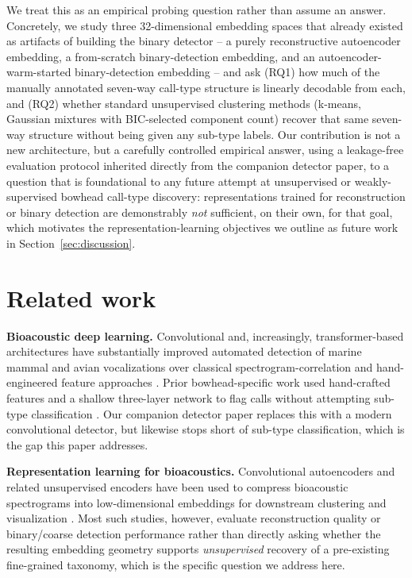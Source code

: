 \documentclass{article}
\begin{document}
We treat this as an empirical probing question rather than assume an
answer. Concretely, we study three 32-dimensional embedding spaces that
already existed as artifacts of building the binary detector -- a purely
reconstructive autoencoder embedding, a from-scratch binary-detection
embedding, and an autoencoder-warm-started binary-detection embedding --
and ask (RQ1) how much of the manually annotated seven-way call-type
structure is linearly decodable from each, and (RQ2) whether standard
unsupervised clustering methods (k-means, Gaussian mixtures with
BIC-selected component count) recover that same seven-way structure
without being given any sub-type labels. Our contribution is not a new
architecture, but a carefully controlled empirical answer, using a
leakage-free evaluation protocol inherited directly from the companion
detector paper, to a question that is foundational to any future attempt
at unsupervised or weakly-supervised bowhead call-type discovery: representations trained for
reconstruction or binary detection are demonstrably \emph{not}
sufficient, on their own, for that goal, which motivates the
representation-learning objectives we outline as future work in
Section~\ref{sec:discussion}.

\section{Related work}
\label{sec:related}

\textbf{Bioacoustic deep learning.} Convolutional and, increasingly,
transformer-based architectures have substantially improved automated
detection of marine mammal and avian vocalizations over classical
spectrogram-correlation and hand-engineered feature approaches
\citep{shiu2020deep, allen2021convolutional}. Prior bowhead-specific work
used hand-crafted features and a shallow three-layer network to flag calls
without attempting sub-type classification \citep{thode2012automated}. Our
companion detector paper replaces this with a modern convolutional
detector, but likewise stops short of sub-type classification, which is
the gap this paper addresses.

\textbf{Representation learning for bioacoustics.} Convolutional
autoencoders and related unsupervised encoders have been used to compress
bioacoustic spectrograms into low-dimensional embeddings for downstream
clustering and visualization \citep{ozanich2021deep, hinton2006reducing}.
Most such studies, however, evaluate reconstruction quality or
binary/coarse detection performance rather than directly asking whether
the resulting embedding geometry supports \emph{unsupervised} recovery of
a pre-existing fine-grained taxonomy, which is the specific question we
address here.
\end{document}
